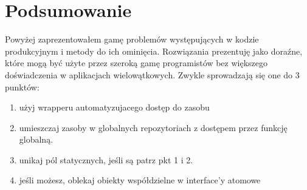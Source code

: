 \section{Podsumowanie}
Powyżej zaprezentowałem gamę problemów występujących w kodzie produkcyjnym i metody do ich ominięcia. Rozwiązania prezentuję jako doraźne, które mogą być użyte przez szeroką gamę programistów bez większego doświadczenia w aplikacjach wielowątkowych. Zwykle sprowadzają się one do 3 punktów:
\begin{enumerate}
\item użyj wrapperu  automatyzujacego dostęp do zasobu
\item umieszczaj zasoby w globalnych repozytoriach z dostępem przez funkcję globalną.
\item unikaj pól statycznych, jeśli są patrz pkt 1 i 2.
\item jeśli możesz, oblekaj obiekty współdzielne w interface'y atomowe
\end{enumerate}

